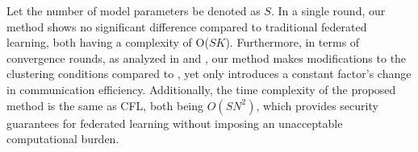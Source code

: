 \documentclass[a4paper,twoside,11pt,dvipsnames]{reviewresponse}
\newtheorem{assumption}{Assumption}[section]
\begin{document}
\color{blue}
Let the number of model parameters be denoted as $S$. In a single round, our method shows no significant difference compared to traditional federated learning, both having a complexity of O($SK$). Furthermore, in terms of convergence rounds, as analyzed in \cite{CoRR} and \cite{9377960}, our method makes modifications to the clustering conditions compared to \cite{9377960}, yet only introduces a constant factor's change in communication efficiency. Additionally, the time complexity of the proposed method is the same as CFL, both being $O(SN^2)$, which provides security guarantees for federated learning without imposing an unacceptable computational burden.
\color{black}



\end{document}
